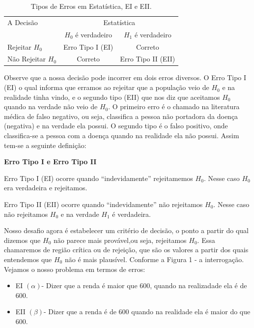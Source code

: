 \documentclass[
  letterpaper,
  DIV=11,
  numbers=noendperiod]{scrartcl}
\begin{document}
\begin{table}[!htbp]
\centering
\caption{\label{tab:erro}Tipos de Erros em Estatística, EI e EII.}
\begin{tabular}{l|cc}
\hline 
A Decisão             & \multicolumn{2}{c}{Estatística }\\
                     & $H_0$ é verdadeiro & $H_1$ é verdadeiro \\
\hline
 Rejeitar $H_0$      &  Erro Tipo I (EI)  & Correto            \\
 Não Rejeitar $H_0$  & Correto            & Erro Tipo II (EII) \\ 
\hline
\end{tabular}
\end{table}

Observe que a nossa decisão pode incorrer em dois erros diversos. O Erro
Tipo I (EI) o qual informa que erramos ao rejeitar que a população veio
de \(H_0\) e na realidade tinha vindo, e o segundo tipo (EII) que nos
diz que aceitamos \(H_0\) quando na verdade não veio de \(H_0\). O
primeiro erro é o chamado na literatura médica de falso negativo, ou
seja, classifica a pessoa não portadora da doença (negativa) e na
verdade ela possui. O segundo tipo é o falso positivo, onde
classifica-se a pessoa com a doença quando na realidade ela não possui.
Assim tem-se a seguinte definição:

\begin{definicao}

\textbf{Erro Tipo I e Erro Tipo II}

Erro Tipo I (EI) ocorre quando ``indevidamente'' rejeitamemos \(H_0\).
Nesse caso \(H_0\) era verdadeira e rejeitamos.

Erro Tipo II (EII) ocorre quando ``indevidamente'' não rejeitamos
\(H_0\). Nesse caso não rejeitamos \(H_0\) e na verdade \(H_1\) é
verdadeira.

\end{definicao}

Nosso desafio agora é estabelecer um critério de decisão, o ponto a
partir do qual dizemos que \(H_0\) não parece mais provável,ou seja,
rejeitamos \(H_0\). Essa chamaremos de região crítica ou de rejeição,
que são os valores a partir dos quais entendemos que \(H_0\) não é mais
plausível. Conforme a Figura 1 - a interrogação. Vejamos o nosso
problema em termos de erros:

\begin{itemize}
\item EI $(\alpha)$- Dizer que a renda é maior que 600, quando na realizadade ela é de 600.
\item EII $(\beta)$- Dizer que a renda é de 600 quando na realidade ela é maior do que 600. 
\end{itemize}
\end{document}
